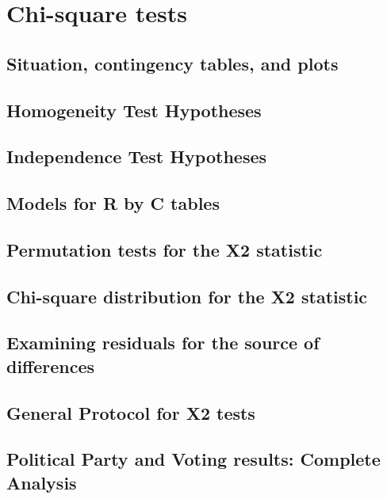 \documentclass[]{book}
\begin{document}
{{\chapter{Chi-square tests}\label{chapter5}

\section{Situation, contingency tables, and plots}\label{section5-1}

\section{Homogeneity Test Hypotheses}\label{section5-2}

\section{Independence Test Hypotheses}\label{section5-3}

\section{Models for R by C tables}\label{section5-4}

\section{Permutation tests for the X2 statistic}\label{section5-5}

\section{Chi-square distribution for the X2 statistic}\label{section5-6}

\section{Examining residuals for the source of
differences}\label{section5-7}

\section{General Protocol for X2 tests}\label{section5-8}

\section{Political Party and Voting results: Complete
Analysis}\label{section5-9}

}}
\end{document}
